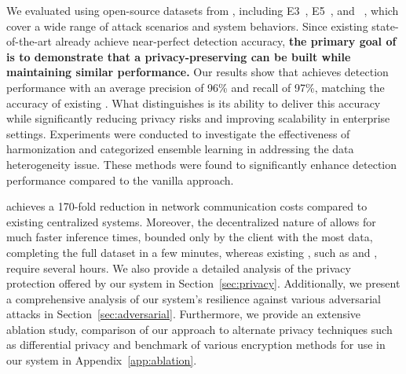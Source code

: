 We evaluated \Sys using open-source datasets from \darpa, including E3~\cite{error3}, E5~\cite{bug5}, and \optc~\cite{anjum2021analyzing}, which cover a wide range of attack scenarios and system behaviors. Since existing state-of-the-art \pids already achieve near-perfect detection accuracy, {\bf the primary goal of \Sys is to demonstrate that a privacy-preserving \pids can be built while maintaining similar performance.} Our results show that \Sys achieves detection performance with an average precision of 96\% and recall of 97\%, matching the accuracy of existing \pids. What distinguishes \Sys is its ability to deliver this accuracy while significantly reducing privacy risks and improving scalability in enterprise settings. Experiments were conducted to investigate the effectiveness of \wordvec harmonization and categorized ensemble learning in addressing the data heterogeneity issue. These methods were found to significantly enhance detection performance compared to the vanilla approach.


\Sys achieves a 170-fold reduction in network communication costs compared to existing centralized systems. Moreover, the decentralized nature of \Sys allows for much faster inference times, bounded only by the client with the most data, completing the full \optc dataset in a few minutes, whereas existing \pids, such as \flash and \kairos, require several hours. We also provide a detailed analysis of the privacy protection offered by our system in Section~\ref{sec:privacy}. Additionally, we present a comprehensive analysis of our system's resilience against various adversarial attacks in Section~\ref{sec:adversarial}. Furthermore, we provide an extensive ablation study, comparison of our approach to alternate privacy techniques such as differential privacy and benchmark of various encryption methods for use in our system in Appendix~\ref{app:ablation}.



